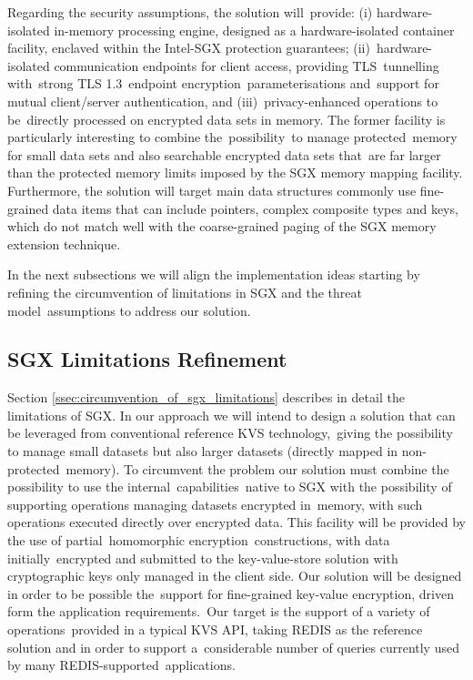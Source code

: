 Regarding the security assumptions, the solution will provide: (i) hardware-isolated in-memory processing engine, designed as a hardware-isolated container facility, enclaved within the Intel-SGX protection guarantees; (ii) hardware-isolated communication endpoints for client access, providing TLS tunnelling with strong TLS 1.3 endpoint encryption parameterisations and support for mutual client/server authentication, and (iii) privacy-enhanced operations to be directly processed on encrypted data sets in memory. The former facility is particularly interesting to combine the possibility to manage protected memory for small data sets and also searchable encrypted data sets that are far larger than the protected memory limits imposed by the SGX memory mapping facility. Furthermore, the solution will target main data structures commonly use fine-grained data items that can include pointers, complex composite types and keys, which do not match well with the coarse-grained paging of the SGX memory extension technique.

In the next subsections we will align the implementation ideas starting by refining the circumvention of limitations in SGX and the threat model assumptions to address our solution.

\subsection{\gls{SGX} Limitations Refinement}
\label{ssec:sgx_limitations_refinement}

Section \ref{ssec:circumvention_of_sgx_limitations} describes in detail the limitations of \gls{SGX}. In our approach we will intend to design a solution that can be leveraged from conventional reference KVS technology, giving the possibility to manage small datasets but also larger datasets (directly mapped in non-protected memory). To circumvent the problem our solution must combine the possibility to use the internal capabilities native to SGX with the possibility of supporting operations managing datasets encrypted in memory, with such operations executed directly over encrypted data. This facility will be provided by the use of partial homomorphic encryption constructions, with data initially encrypted and submitted to the key-value-store solution with cryptographic keys only managed in the client side. Our solution will be designed in order to be possible the support for fine-grained key-value encryption, driven form the application requirements. Our target is the support of a variety of operations provided in a typical KVS API, taking REDIS as the reference solution and in order to support a considerable number of queries currently used by many REDIS-supported applications.

